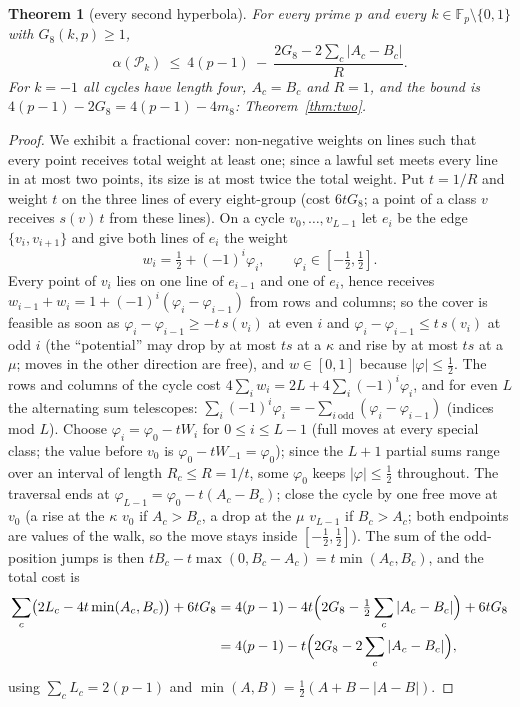 \documentclass[11pt]{article}
\newtheorem{theorem}{Theorem}
\theoremstyle{remark}
\newcommand{\Fp}{\mathbb{F}_p}
\newcommand{\Pset}{\mathcal{P}}
\begin{document}
\begin{theorem}[every second hyperbola]\label{thm:general}
For every prime $p$ and every $k\in\Fp\setminus\{0,1\}$ with $G_8(k,p)\ge1$,
\[
 \alpha(\Pset_k)\ \le\ 4(p-1)\ -\ \frac{2G_8-2\sum_c|A_c-B_c|}{R}.
\]
For $k=-1$ all cycles have length four, $A_c=B_c$ and $R=1$, and the bound is $4(p-1)-2G_8=4(p-1)-4m_8$: Theorem~\ref{thm:two}.
\end{theorem}
\begin{proof}
We exhibit a fractional cover: non-negative weights on lines such that every point receives total weight at least one; since a lawful set
meets every line in at most two points, its size is at most twice the total weight.  Put $t=1/R$ and weight $t$ on the three lines of every
eight-group (cost $6tG_8$; a point of a class $v$ receives $s(v)\,t$ from these lines).  On a cycle $v_0,\dots,v_{L-1}$ let $e_i$ be the
edge $\{v_i,v_{i+1}\}$ and give both lines of $e_i$ the weight
\[
 w_i=\tfrac12+(-1)^i\varphi_i,\qquad \varphi_i\in[-\tfrac12,\tfrac12].
\]
Every point of $v_i$ lies on one line of $e_{i-1}$ and one of $e_i$, hence receives $w_{i-1}+w_i=1+(-1)^i(\varphi_i-\varphi_{i-1})$ from rows
and columns; so the cover is feasible as soon as $\varphi_i-\varphi_{i-1}\ge-t\,s(v_i)$ at even $i$ and $\varphi_i-\varphi_{i-1}\le t\,s(v_i)$
at odd $i$ (the ``potential'' may drop by at most $ts$ at a $\kappa$ and rise by at most $ts$ at a $\mu$; moves in the other direction are
free), and $w\in[0,1]$ because $|\varphi|\le\frac12$.  The rows and columns of the cycle cost $4\sum_iw_i=2L+4\sum_i(-1)^i\varphi_i$, and for
even $L$ the alternating sum telescopes: $\sum_i(-1)^i\varphi_i=-\sum_{i\ \mathrm{odd}}(\varphi_i-\varphi_{i-1})$ (indices mod $L$).  Choose
$\varphi_i=\varphi_0-tW_i$ for $0\le i\le L-1$ (full moves at every special class; the value before $v_0$ is $\varphi_0-tW_{-1}=\varphi_0$); since the
$L+1$ partial sums range over an interval of length $R_c\le R=1/t$, some $\varphi_0$ keeps $|\varphi|\le\frac12$ throughout.  The traversal ends at $\varphi_{L-1}=\varphi_0-t(A_c-B_c)$; close the cycle by one
free move at $v_0$ (a rise at the $\kappa$ $v_0$ if $A_c>B_c$, a drop at the $\mu$ $v_{L-1}$ if $B_c>A_c$; both endpoints are values of the
walk, so the move stays inside $[-\frac12,\frac12]$).  The sum of the odd-position jumps is then $tB_c-t\max(0,B_c-A_c)=t\min(A_c,B_c)$, and
the total cost is
\begin{align*}
 \sum_c\bigl(2L_c-4t\min(A_c,B_c)\bigr)+6tG_8&=4(p-1)-4t\Bigl(2G_8-\tfrac12\sum_c|A_c-B_c|\Bigr)+6tG_8\\
 &=4(p-1)-t\Bigl(2G_8-2\sum_c|A_c-B_c|\Bigr),
\end{align*}
using $\sum_cL_c=2(p-1)$ and $\min(A,B)=\frac12(A+B-|A-B|)$.
\end{proof}
\end{document}
